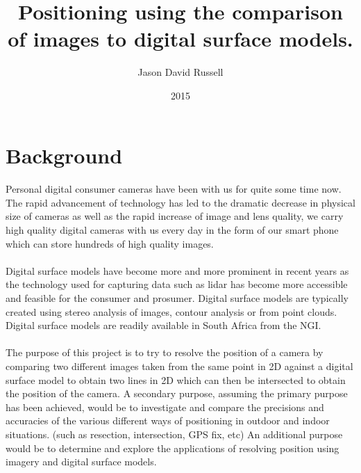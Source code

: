 \documentclass{article}
\title{Positioning using the comparison of images to digital surface models.}
\date{2015}
\author{Jason David Russell}
\begin{document}
\maketitle
{}

\newpage
\tableofcontents

\newpage
{}

\section{Background}
\paragraph{}
Personal digital consumer cameras have been with us for quite some time now. The rapid advancement of technology has led to the dramatic decrease in physical size of cameras as well as the rapid increase of image and lens quality, we carry high quality digital cameras with us every day in the form of our smart phone which can store hundreds of high quality images.

\paragraph{}
Digital surface models have become more and more prominent in recent years as the technology used for capturing data such as lidar has become more accessible and feasible for the consumer and prosumer. Digital surface models are typically created using stereo analysis of images, contour analysis or from point clouds. Digital surface models are readily available in South Africa from the NGI.

\paragraph{}
The purpose of this project is to try to resolve the position of a camera by comparing two different images taken from the same point in 2D against a digital surface model to obtain two lines in 2D which can then be intersected to obtain the position of the camera. A secondary purpose, assuming the primary purpose has been achieved, would be to investigate and compare the precisions and accuracies of the various different ways of positioning in outdoor and indoor situations. (such as resection, intersection, GPS fix, etc) An additional purpose would be to determine and explore the applications of resolving position using imagery and digital surface models.
\end{document}
